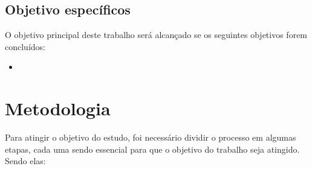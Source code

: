 \subsection{Objetivo específicos}
O objetivo principal deste trabalho será alcançado se os seguintes objetivos forem concluídos:

\begin{itemize}
	\item
\end{itemize}

\section{Metodologia}
Para atingir o objetivo do estudo, foi necessário dividir o processo em algumas etapas, cada uma sendo
essencial para que o objetivo do trabalho seja atingido. Sendo elas:

